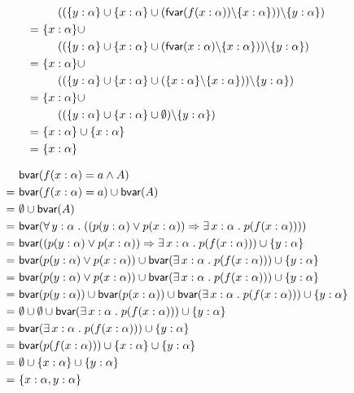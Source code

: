 \documentclass[11pt,fleqn]{article}
\newcommand{\mname}[1]{\mbox{\sf #1}}
\renewcommand{\And}{\wedge}
\newcommand{\And}{\wedge}
\newcommand{\Or}{\vee}
\newcommand{\Implies}{\Rightarrow}
\newcommand{\ForallApp}{\forall\,}
\newcommand{\ForsomeApp}{\exists\,}
\newcommand{\mdot}{\mathrel.}
\begin{document}
\begin{align*}
	    & ~~~~((\{y:\alpha\} \cup \{x:\alpha\}
	    \cup (\mname{fvar}(f(x:\alpha)) \backslash \{x : \alpha\}))
	    \backslash \{y : \alpha\}
	    ) \\
	    =~ & \{x:\alpha\} \cup \\
	    & ~~~~((\{y:\alpha\} \cup \{x:\alpha\}
	    \cup (\mname{fvar}(x:\alpha) \backslash \{x : \alpha\}))
	    \backslash \{y : \alpha\}
	    ) \\
	    =~ & \{x:\alpha\} \cup \\
	    & ~~~~((\{y:\alpha\} \cup \{x:\alpha\}
	    \cup (\{x:\alpha\} \backslash \{x : \alpha\}))
	    \backslash \{y : \alpha\}
	    ) \\
	    =~ & \{x:\alpha\} \cup \\
	    & ~~~~((\{y:\alpha\} \cup \{x:\alpha\}
	    \cup \emptyset)
	    \backslash \{y : \alpha\}
	    ) \\
	    =~ & \{x:\alpha\} \cup \{x:\alpha\} \\
	    =~ & \{x:\alpha\}
    \end{align*}
    
    \begin{align*}
	    & \mname{bvar}( f(x:\alpha) = a \And {} A) \\
	    =~ & \mname{bvar}( f(x:\alpha) = a) \cup \mname{bvar}(A) \\
	    =~ & \emptyset \cup \mname{bvar}(A) \\
	    =~ & \mname{bvar}(\ForallApp y : \alpha \mdot ((p(y:\alpha) \Or p(x:\alpha)) \Implies \ForsomeApp x : \alpha \mdot p(f(x:\alpha)))) \\
	    =~ & \mname{bvar}((p(y:\alpha) \Or p(x:\alpha)) \Implies \ForsomeApp x : \alpha \mdot p(f(x:\alpha))) \cup \{y : \alpha\} \\
	    =~ & \mname{bvar}(p(y:\alpha) \Or p(x:\alpha)) \cup
	    \mname{bvar}(\ForsomeApp x : \alpha \mdot p(f(x:\alpha))) \cup 
	    \{y : \alpha\} \\
	    =~ & \mname{bvar}(p(y:\alpha) \Or p(x:\alpha)) \cup
	    \mname{bvar}(\ForsomeApp x : \alpha \mdot p(f(x:\alpha))) \cup 
	    \{y : \alpha\} \\
	    =~ & \mname{bvar}(p(y:\alpha)) \cup
	    \mname{bvar}(p(x:\alpha)) \cup
	    \mname{bvar}(\ForsomeApp x : \alpha \mdot p(f(x:\alpha))) \cup 
	    \{y : \alpha\} \\
	    =~ & \emptyset \cup
	    \emptyset \cup
	    \mname{bvar}(\ForsomeApp x : \alpha \mdot p(f(x:\alpha))) \cup 
	    \{y : \alpha\} \\
	    =~ & \mname{bvar}(\ForsomeApp x : \alpha \mdot p(f(x:\alpha))) \cup 
	    \{y : \alpha\} \\
	    =~ & \mname{bvar}(p(f(x:\alpha))) \cup \{x : \alpha\} \cup \{y : \alpha\} \\
	    =~ & \emptyset \cup \{x : \alpha\} \cup \{y : \alpha\} \\
	    =~ & \{x : \alpha , y : \alpha\} \\
    \end{align*}
\end{document}
